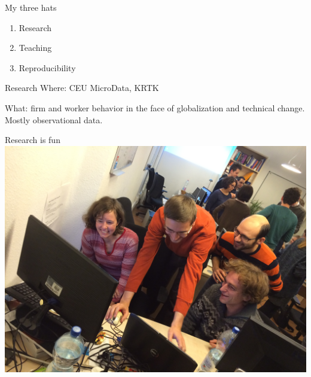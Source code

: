 \documentclass[
  ignorenonframetext,
  aspectratio=54,
]{beamer}
\providecommand{\tightlist}{%
  \setlength{\itemsep}{0pt}\setlength{\parskip}{0pt}}
\begin{document}
\begin{frame}{My three hats}
\protect\hypertarget{my-three-hats}{}
\begin{enumerate}
\tightlist
\item
  Research
\item
  Teaching
\item
  Reproducibility
\end{enumerate}
\end{frame}

\begin{frame}{Research}
\protect\hypertarget{research}{}
Where: CEU MicroData, KRTK

What: firm and worker behavior in the face of globalization and
technical change. Mostly observational data.
\end{frame}

\begin{frame}{Research is fun}
\protect\hypertarget{research-is-fun}{}
\includegraphics{assets/img/mosoly.jpg}
\end{frame}
\end{document}
